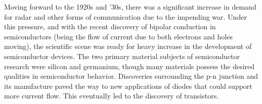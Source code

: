 \documentclass[12pt]{article}
\begin{document}
\begin{flushleft}
Moving forward to the 1920s and '30s, there was a significant
increase in demand for radar and other forms of communication
due to the impending war. Under this pressure, and
with the recent discovery of bipolar conduction in
semiconductors (being the flow of current due to both
electrons and holes moving), the scientific scene was
ready for heavy increase in the development of semiconductor
devices. The two primary material subjects of semiconductor
research were silicon and germanium, though many materials
possess the desired qualities in semiconductor behavior.
Discoveries surrounding the p-n junction and its manufacture
paved the way to new applications of diodes that could
support more current flow. This eventually led to the
discovery of transistors.






\newpage
\nocite{*}
\printbibliography

\end{flushleft}
\end{document}

